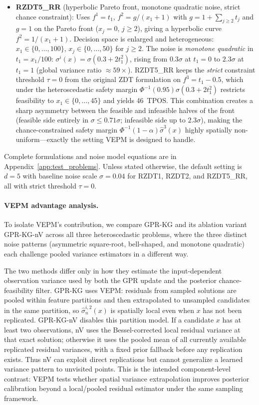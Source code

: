 \documentclass[12pt]{article}
\theoremstyle{plain}
\theoremstyle{definition}
\theoremstyle{remark}
\begin{document}
\begin{itemize}[leftmargin=2em]
  \item \textbf{RZDT5\_RR} (hyperbolic Pareto front, monotone
    quadratic noise, strict chance constraint):  Uses $f^1=t_1$,
    $f^2=g/(x_1+1)$ with $g=1+\sum_{j\ge2}t_j$ and $g=1$ on the
    Pareto front ($x_j=0$, $j\ge2$), giving a hyperbolic curve
    $f^2=1/(x_1+1)$.  Decision space is enlarged and heterogeneous:
    $x_1\in\{0,\ldots,100\}$, $x_j\in\{0,\ldots,50\}$ for $j\ge2$.
    The noise is \emph{monotone quadratic} in $t_1=x_1/100$:
    $\sigma^i(x)=\sigma(0.3+2t_1^2)$, rising from $0.3\sigma$ at
    $t_1=0$ to $2.3\sigma$ at $t_1=1$ (global variance ratio
    ${\approx}59\times$).  RZDT5\_RR keeps the \emph{strict}
    constraint threshold $\tau=0$ from the original ZDT formulation on
    $f^3=t_1-0.5$, which under the heteroscedastic safety margin
    $\Phi^{-1}(0.95)\sigma(0.3+2t_1^2)$ restricts feasibility to
    $x_1\in\{0,\ldots,45\}$ and yields 46~TPOS.  This combination
    creates a sharp asymmetry between the feasible and infeasible
    halves of the front (feasible side entirely in
    $\sigma\le0.71\sigma$; infeasible side up to $2.3\sigma$), making
    the chance-constrained safety margin $\Phi^{-1}(1-\alpha)\hat\sigma^3(x)$
    highly spatially non-uniform---exactly the setting VEPM is
    designed to handle.
\end{itemize}

Complete formulations and noise model equations are in
Appendix~\ref{app:test_problems}.  Unless stated otherwise, the default
setting is $d=5$ with baseline noise scale $\sigma=0.04$ for RZDT1,
RZDT2, and RZDT5\_RR, all with strict threshold $\tau=0$.

\paragraph{VEPM advantage analysis.}
To isolate VEPM's contribution, we compare GPR-KG and its ablation
variant GPR-KG-nV across all three heteroscedastic problems, where the
three distinct noise patterns (asymmetric square-root, bell-shaped, and
monotone quadratic) each
challenge pooled variance estimators in a different way.

The two methods differ only in how they estimate the input-dependent
observation variance used by both the GPR update and the posterior
chance-feasibility filter.  GPR-KG uses VEPM: residuals from sampled
solutions are pooled within feature partitions and then extrapolated to
unsampled candidates in the same partition, so
$\hat{\sigma}^{i,2}_n(x)$ is spatially local even when $x$ has not been
replicated.  GPR-KG-nV disables this partition model.  If a candidate
$x$ has at least two observations, nV uses the Bessel-corrected local
residual variance at that exact solution; otherwise it uses the pooled
mean of all currently available replicated residual variances, with a
fixed prior fallback before any replication exists.  Thus nV can exploit
direct replications but cannot generalize a learned variance pattern to
unvisited points.  This is the intended component-level contrast:
VEPM tests whether spatial variance extrapolation improves posterior
calibration beyond a local/pooled residual estimator under the same
sampling framework.
\end{document}

